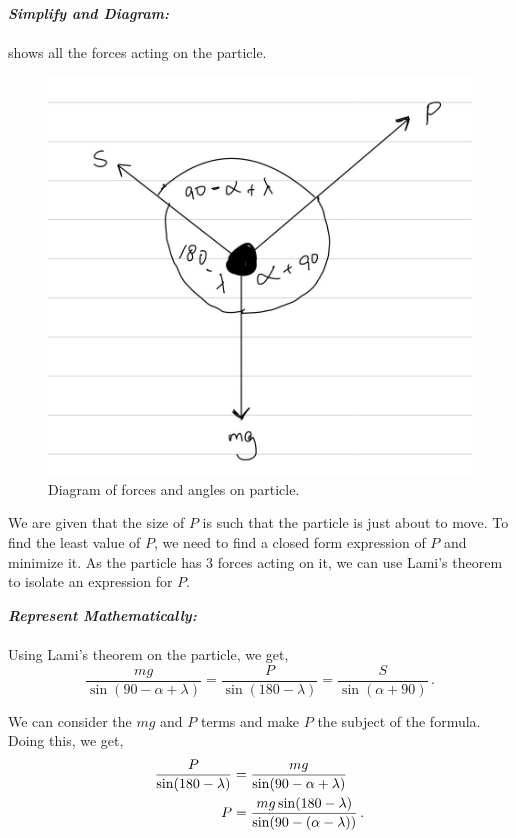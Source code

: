 \begin{subquestions}
\begin{subsubquestions}
\textbf{\textit{Simplify and Diagram:}} \\ \\
 shows all the forces acting on the particle.
\begin{figure} [H]
	\begin{center} 
		\includegraphics[scale=0.25]{../2014/figures/2014-q5-b-2}
		\caption{\label{2014:q5:Force2} Diagram of forces and angles on particle.}
	\end{center}
\end{figure}

We are given that the size of $P$ is such that the particle is just about to move. To find the least value of $P$, we need to find a closed form expression of $P$ and minimize it. As the particle has 3 forces acting on it, we can use Lami's theorem to isolate an expression for $P$.

\textbf{\textit{Represent Mathematically:}} \\ \\
Using Lami's theorem on the particle, we get,
\begin{equation}
	\frac{mg}{\sin(90-\alpha+\lambda)} = \frac{P}{\sin(180-\lambda)} = \frac{S}{\sin(\alpha+90)} \,.
\end{equation}

We can consider the $mg$ and $P$ terms and make $P$ the subject of the formula. Doing this, we get,
\begin{align}
	 \frac{P}{\sin(180-\lambda)} & = \frac{mg}{\sin(90-\alpha+\lambda)}\nonumber \\
	 P & = \frac{mg\sin(180-\lambda)}{\sin(90-(\alpha-\lambda))}\,.
\end{align}


\end{subsubquestions}
\end{subquestions}
